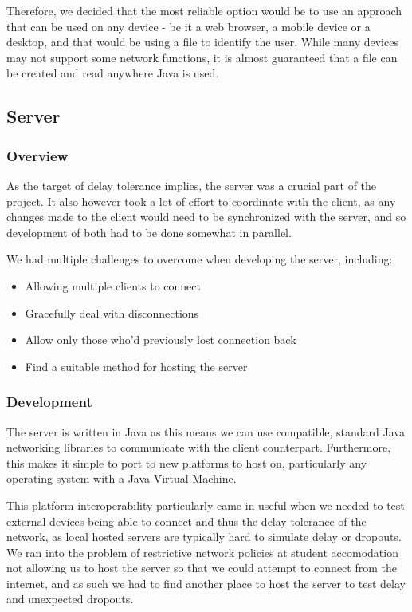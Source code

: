 \documentclass[11pt]{article}
\begin{document}
Therefore, we decided that the most reliable option would be to use an approach that can be used on any device - be it a web browser, a mobile device or a desktop, and that would be using a file to identify the user. While many devices may not support some network functions, it is almost guaranteed that a file can be created and read anywhere Java is used. 

\subsection{Server}
\subsubsection{Overview}
As the target of delay tolerance implies, the server was a crucial part of the project. It also however took a lot of effort to coordinate with the client, as any changes made to the client would need to be synchronized with the server, and so development of both had to be done somewhat in parallel. 

We had multiple challenges to overcome when developing the server, including:

\begin{itemize}
	\item Allowing multiple clients to connect
	\item Gracefully deal with disconnections
	\item Allow only those who'd previously lost connection back
	\item Find a suitable method for hosting the server
\end{itemize}


\subsubsection{Development}
The server is written in Java as this means we can use compatible, standard Java networking libraries to communicate with the client counterpart. Furthermore, this makes it simple to port to new platforms to host on, particularly any operating system with a Java Virtual Machine.

This platform interoperability particularly came in useful when we needed to test external devices being able to connect and thus the delay tolerance of the network, as local hosted servers are typically hard to simulate delay or dropouts. We ran into the problem of restrictive network policies at student accomodation not allowing us to host the server so that we could attempt to connect from the internet, and as such we had to find another place to host the server to test delay and unexpected dropouts. \\
\end{document}
